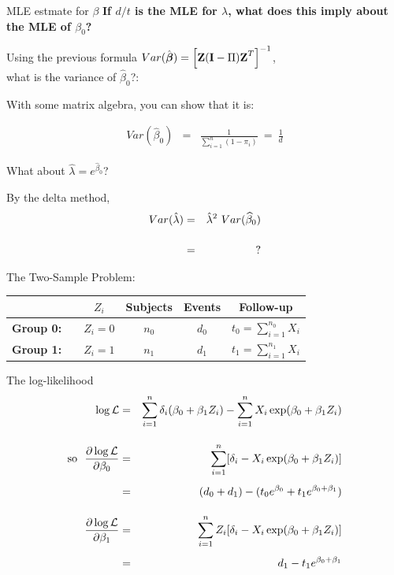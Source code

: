 \documentclass[envcountsect, 10pt, portrait, palatino]{beamer}
\newcommand{\bfbeta}{{\mbox{\boldmath$\beta$}}}
\newcommand{\bfZ}{{\mbox{{\bf Z}}}}
\newcommand{\bfI}{\mathbf{I}}
\begin{document}
\begin{frame}{MLE estmate for $\beta$}
{\bf If $d/t$ is the MLE for $\lambda$, what does this imply about
the MLE of $\beta_0$?}

Using the previous formula
$Var(\hat{\bfbeta}) = \left[ \bfZ (\bfI-\Pi) \bfZ^T \right]^{-1}$, \\
what is the variance of $\widehat{\beta}_0$?:

\vspace{0.3in}
With some matrix algebra, you can show that it is:

\begin{eqnarray*}
Var(\widehat{\beta}_0) & = & \frac{1}{\sum_{i=1}^n (1-\pi_i)} ~=~ \frac{1}{d}
\end{eqnarray*}

\end{frame} 
\begin{frame}{What about $\hat{\lambda} = e^{\hat{\beta}_0}$?}

By the delta method,
\begin{eqnarray*}
Var(\hat{\lambda}) & = & \hat\lambda^2 ~ Var(\widehat{\beta}_0)\\[3ex]
& = & ~~{\bf ?}
\end{eqnarray*}
\end{frame} \begin{frame}{The Two-Sample Problem:}

\begin{center}
\begin{tabular}{lcccc}
\hline
& $Z_i$ & Subjects & Events & Follow-up \\ \hline
{\bf Group 0:}~~
& $Z_{i}= 0$ & $n_0$ & $d_0$ & $t_0=\sum_{i=1}^{n_0} X_i$\\[1ex]
{\bf Group 1:}
& $Z_{i}= 1$ & $n_1$ & $d_1$ & $t_1=\sum_{i=1}^{n_1} X_i$ \\ \hline
\end{tabular}
\end{center}
\end{frame}
\begin{frame}{The log-likelihood}
\vspace{-0.3in}
\begin{eqnarray*}
\log {\cal L} & = &  \sum_{i=1}^{n} {\delta_i} (\beta_0 + \beta_1 Z_i) -
\sum_{i=1}^{n} X_i\exp(\beta_0 + \beta_1 Z_i)\\[2.5ex]
\mbox{so} ~~\frac{\partial\log{\cal L}  }{\partial \beta_0}
    & =  &  \sum_{i=1}^{n}  [ \delta_i -
   X_i \exp( \beta_0 + \beta_1 Z_{i} )]  \\[1ex]
   & =  & (d_0 + d_1) - (t_0 e^{\beta_0} + t_1 e^{\beta_0+\beta_1}) \\[2.5ex]
\frac{\partial\log{\cal L}  }{\partial \beta_1}
    & =  &  \sum_{i=1}^{n}  Z_i[ {\delta_i} -
   X_i \exp( \beta_0 + \beta_1 Z_{i} )]  \\[1ex]
   & =  &  d_1 -  t_1 e^{\beta_0+\beta_1}
\end{eqnarray*}
\end{frame}
\end{document}
